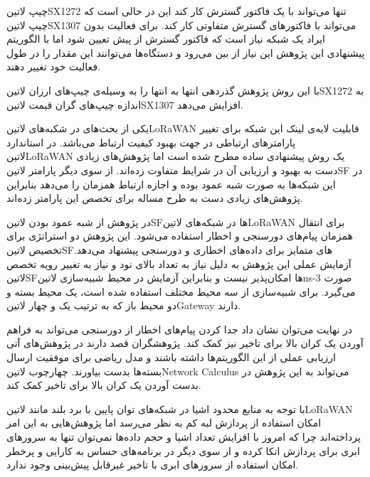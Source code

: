 چیپ ‌لاتین{SX1272} تنها می‌تواند با یک فاکتور گسترش کار کند این در حالی است که چیپ ‌لاتین{SX1307} می‌تواند با فاکتورهای گسترش متفاوتی کار کند.
برای فعالیت بدون ایراد یک شبکه نیاز است که فاکتور گسترش از پیش تعیین شود اما با الگوریتم پیشنهادی این پژوهش این نیاز از بین می‌رود و دستگاه‌ها می‌توانند
این مقدار را در طول فعالیت خود تغییر دهند.

با این روش پژوهش گذردهی انتها به انتها را به وسیله‌ی چیپ‌های ارزان ‌لاتین{SX1272} به اندازه چیپ‌های گران قیمت ‌لاتین{SX1307} افزایش می‌دهد.


یکی از بحث‌های در شکبه‌های ‌لاتین{LoRaWAN} قابلیت لایه‌ی لینک این شبکه برای تغییر پارامترهای ارتباطی در جهت بهبود کیفیت ارتباط می‌باشد. در استاندارد ‌لاتین{LoRaWAN} یک روش پیشنهادی ساده مطرح شده است
اما پژوهش‌های زیادی دست به بهبود و ارزیابی آن در شرایط متفاوت زده‌اند. از سوی دیگر پارامتر ‌لاتین{SF} در این شبکه‌ها به صورت شبه عمود بوده و اجازه ارتباط همزمان را می‌دهد بنابراین پژوهش‌های زیادی دست به طرح مساله
برای تخصص این پارامتر زده‌اند.


در پژوهش  از شبه عمود بودن ‌لاتین{SF}ها در شبکه‌های ‌لاتین{LoRaWAN} برای انتقال همزمان پیام‌های دورسنجی و اخطار استفاده می‌شود.
این پژوهش دو استراتژی برای تخصیص ‌لاتین{SF}های متمایز برای داده‌های اخطاری و دورسنجی پیشنهاد می‌دهد.
آزمایش عملی این پژوهش به دلیل نیاز به تعداد بالای نود و نیاز به تغییر رویه تخصص ‌لاتین{SF}ها امکان‌پذیر نیست و بنابراین آزمایش در محیط شبیه‌سازی ‌لاتین{ns-3} صورت می‌گیرد.
برای شبیه‌سازی از سه محیط مختلف استفاده شده است، یک محیط بسته و دو محیط باز که به ترتیب یک و چهار ‌لاتین{Gateway} دارند.

در نهایت می‌توان نشان داد جدا کردن پیام‌های اخطار از دورسنجی می‌تواند به فراهم آوردن یک کران بالا برای تاخیر نیز کمک کند. پژوهشگران قصد دارند در پژوهش‌های آتی ارزیابی عملی از این الگوریتم‌ها داشته باشند
و مدل ریاضی برای موفقیت ارسال بسته‌ها بدست بیاورند. چهارچوب ‌لاتین{Network Calculus} می‌تواند به این پژوهش در بدست آوردن یک کران بالا برای تاخیر کمک کند.



با توجه به منابع محدود اشیا در شبکه‌های توان پایین با برد بلند مانند ‌لاتین{LoRaWAN} امکان استفاده از پردازش لبه کم به نظر می‌رسد اما پژوهش‌هایی به این امر پرداخته‌اند
چرا که امروز با افزایش تعداد اشیا و حجم داده‌ها نمی‌توان تنها به سرورهای ابری برای پردازش اتکا کرده و از سوی دیگر در برنامه‌های حساس به کارایی و پرخطر امکان استفاده از سرورهای
ابری با تاخیر غیرقابل پیش‌بینی وجود ندارد.

